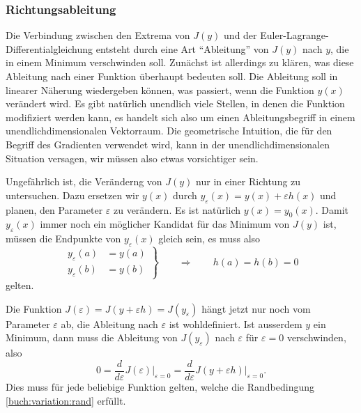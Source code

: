 \subsubsection{Richtungsableitung}
%
Die Verbindung zwischen den Extrema von $J(y)$ und der
Euler-Lagrange-Differentialgleichung entsteht durch eine Art ``Ableitung''
von $J(y)$ nach $y$, die in einem Minimum verschwinden soll.
Zunächst ist allerdings zu klären, was diese Ableitung nach einer Funktion
überhaupt bedeuten soll.
Die Ableitung soll in linearer Näherung wiedergeben können, was
passiert, wenn die Funktion $y(x)$ verändert wird.
Es gibt natürlich unendlich viele Stellen, in denen die Funktion
modifiziert werden kann, es handelt sich also um einen Ableitungsbegriff
in einem unendlichdimensionalen Vektorraum.
%
%
Die geometrische Intuition, die für den Begriff des Gradienten
verwendet wird, kann in der unendlichdimensionalen Situation versagen,
wir müssen also etwas vorsichtiger sein.
%

Ungefährlich ist, die Veränderng von $J(y)$ nur in einer Richtung 
zu untersuchen.
Dazu ersetzen wir $y(x)$ durch $y_{\varepsilon}(x)=y(x)+\varepsilon h(x)$
und planen, den Parameter $\varepsilon$ zu verändern.
Es ist natürlich $y(x)=y_0(x)$.
Damit $y_{\varepsilon}(x)$ immer noch ein möglicher Kandidat für das Minimum
von $J(y)$ ist, müssen die Endpunkte von $y_{\varepsilon}(x)$ gleich sein,
es muss also
\begin{equation}
\left.
\begin{aligned}
y_{\varepsilon}(a)&=y(a) \\
y_{\varepsilon}(b)&=y(b) 
\end{aligned}
\right\}
\qquad\Rightarrow\qquad
h(a)=h(b)=0
\label{buch:variation:rand}
\end{equation}
gelten.

Die Funktion $J(\varepsilon) = J(y+\varepsilon h) = J(y_{\varepsilon})$
hängt jetzt nur noch vom Parameter $\varepsilon$ ab, die Ableitung nach
$\varepsilon$ ist wohldefiniert.
Ist ausserdem $y$ ein Minimum, dann muss die Ableitung von
$J(y_{\varepsilon})$ nach $\varepsilon$ für $\varepsilon=0$
verschwinden, also
\[
0
=
\frac{d}{d\varepsilon} J(\varepsilon)\bigg|_{\varepsilon=0}
=
\frac{d}{d\varepsilon} J(y+\varepsilon h)\bigg|_{\varepsilon=0}.
\]
Dies muss für jede beliebige Funktion gelten, welche die Randbedingung
\eqref{buch:variation:rand} erfüllt.
%

